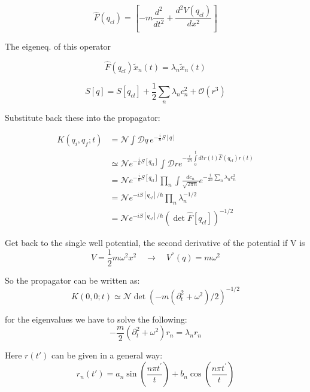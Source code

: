 \documentclass[12pt,a4paper]{article}
\numberwithin{equation}{section}
\begin{document}
\begin{equation}
\hat{F}(q_{cl}) = \left[ -m \frac{d^2}{dt^2} + \frac{d^2 V(q_{cl})}{dx^2}  \right]
\end{equation}

The eigeneq. of this operator

\begin{equation}
\hat{F}(q_{cl}) \tilde{x}_n (t) = \lambda_n \tilde{x}_n (t)
\end{equation}

\begin{equation}
S[q] = S[q_{cl}] + \frac{1}{2}\sum_n \lambda_n c_n^2 + \mathcal{O}(r^3)
\end{equation}

Substitute back these into the propagator:

\begin{align}\label{dc0}
K(q_i,q_f;t) &= \mathcal{N} \int \mathcal{D}q\, e^{-\frac{i}{\hbar} S[q]}\\
&\simeq \mathcal{N} e^{-\frac{i}{\hbar} S[q_{cl}]} \int \mathcal{D}r e^{-\frac{i}{2\hbar} \int\limits_{0}^t dt r(t) \hat{F}(q_{cl}) r(t)} \\
&= \mathcal{N} e^{-\frac{i}{\hbar} S[q_{cl}]} \prod_n \int \frac{dc_n}{\sqrt{2\pi \hbar}} e^{-\frac{i}{2\hbar} \sum_n \lambda_n c^2_n} \\
&= \mathcal{N} e^{-i S[q_{cl}]/\hbar} \prod_n \lambda_n^{-1/2} \\
&= \mathcal{N} e^{-i S[q_{cl}]/\hbar} \left(\det \hat{F}[q_{cl}]\right)^{-1/2}
\end{align}

Get back to the single well potential, the second derivative of the potential if V  is
$$
V = \frac{1}{2}m \omega^2 x^2 \quad \rightarrow \quad V^{''}(q) = m\omega^2
$$

So the propagator can be written as:
\begin{equation}
K(0,0;t) \simeq \mathcal{N} \det\left( -m(\partial_t^2 + \omega^2)/2  \right)^{-1/2}
\end{equation}

for the eigenvalues we have to solve the following:
\begin{equation}
-\frac{m}{2} (\partial^2_t + \omega^2) r_n = \lambda_n r_n
\end{equation}

Here $r(t')$ can be given in a general way:
\begin{equation}
r_n(t') = a_n \sin\left(\frac{n \pi t^{'}}{t}\right) + b_n \cos\left(\frac{n\pi t^{'}}{t}\right)
\end{equation}
\end{document}
